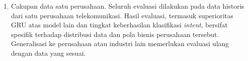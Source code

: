 \begin{enumerate}
    \item Cakupan data satu perusahaan.
    Seluruh evaluasi dilakukan pada data historis dari satu perusahaan telekomunikasi. Hasil evaluasi, termasuk superioritas GRU atas model lain dan tingkat keberhasilan klasifikasi \textit{intent}, bersifat spesifik terhadap distribusi data dan pola bisnis perusahaan tersebut. Generalisasi ke perusahaan atau industri lain memerlukan evaluasi ulang dengan data yang sesuai.
\end{enumerate}
